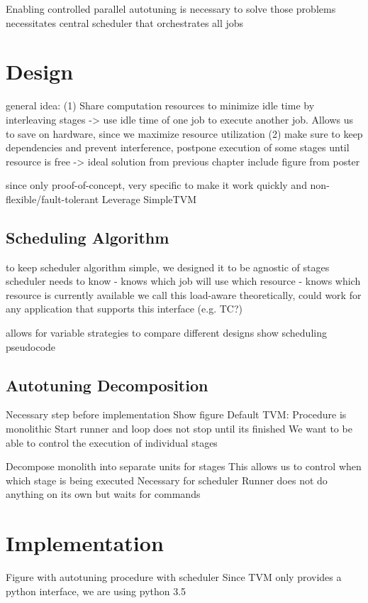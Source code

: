 Enabling controlled parallel autotuning is necessary to solve those problems
necessitates central scheduler that orchestrates all jobs

\section{Design}
general idea: 
(1) Share computation resources to minimize idle time by interleaving stages -> use idle time of one job to execute another job.
Allows us to save on hardware, since we maximize resource utilization
(2) make sure to keep dependencies and prevent interference, postpone execution of some stages until resource is free
-> ideal solution from previous chapter
include figure from poster

since only proof-of-concept, very specific to make it work quickly and non-flexible/fault-tolerant
Leverage SimpleTVM

\subsection{Scheduling Algorithm}
to keep scheduler algorithm simple, we designed it to be agnostic of stages
scheduler needs to know
- knows which job will use which resource
- knows which resource is currently available
we call this load-aware
theoretically, could work for any application that supports this interface (e.g. TC?)

allows for variable strategies to compare different designs
show scheduling pseudocode

\subsection{Autotuning Decomposition}
Necessary step before implementation
Show figure
Default TVM:
Procedure is monolithic
Start runner and loop does not stop until its finished
We want to be able to control the execution of individual stages

Decompose monolith into separate units for stages
This allows us to control when which stage is being executed
Necessary for scheduler
Runner does not do anything on its own but waits for commands

\section{Implementation}
Figure with autotuning procedure with scheduler
Since TVM only provides a python interface, we are using python 3.5

